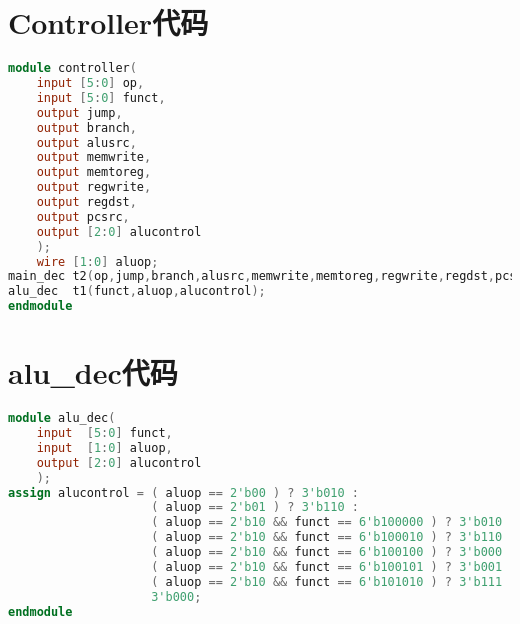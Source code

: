 \newpage
\appendix
\section{Controller代码}
\begin{lstlisting}[language=Verilog]
    module controller(
    input [5:0] op,
    input [5:0] funct,
    output jump,
    output branch,
    output alusrc,
    output memwrite,
    output memtoreg,
    output regwrite,
    output regdst,
    output pcsrc,
    output [2:0] alucontrol
    );
    wire [1:0] aluop;
main_dec t2(op,jump,branch,alusrc,memwrite,memtoreg,regwrite,regdst,pcsrc,aluop);
alu_dec  t1(funct,aluop,alucontrol);
endmodule
\end{lstlisting}

\section{alu\_dec代码}
\begin{lstlisting}[language=Verilog]
    module alu_dec(
    input  [5:0] funct,
    input  [1:0] aluop,
    output [2:0] alucontrol
    );
assign alucontrol = ( aluop == 2'b00 ) ? 3'b010 : 
                    ( aluop == 2'b01 ) ? 3'b110 : 
                    ( aluop == 2'b10 && funct == 6'b100000 ) ? 3'b010 : 
                    ( aluop == 2'b10 && funct == 6'b100010 ) ? 3'b110 : 
                    ( aluop == 2'b10 && funct == 6'b100100 ) ? 3'b000 : 
                    ( aluop == 2'b10 && funct == 6'b100101 ) ? 3'b001 :
                    ( aluop == 2'b10 && funct == 6'b101010 ) ? 3'b111 :
                    3'b000;
endmodule
\end{lstlisting}

